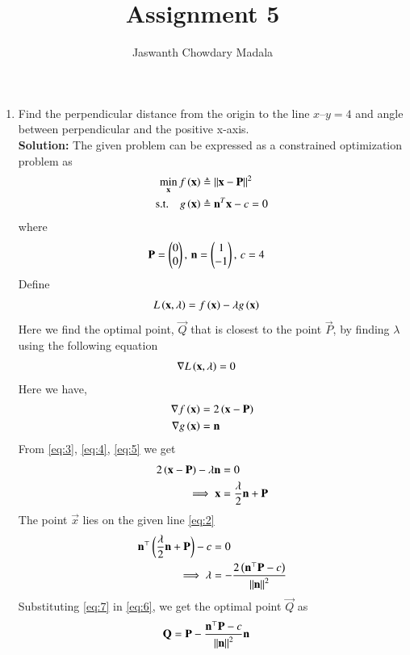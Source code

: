 \documentclass[journal,12pt,twocolumn]{IEEEtran}
\begin{document}
\vspace{3cm}


\title{Assignment 5}
\author{Jaswanth Chowdary Madala}


\maketitle

\newpage


\bigskip

\renewcommand{\thefigure}{\theenumi}
\renewcommand{\thetable}{\theenumi}

\begin{enumerate}
\item Find the perpendicular distance from the origin to the line $x – y = 4$ and angle between perpendicular and the positive x-axis.\\
\textbf{Solution:} The given problem can be expressed as a constrained optimization problem as 
\begin{align}
	\min_{\mathbf{x}}f\left(\mathbf{x}\right) &\triangleq \left\lVert\mathbf{x}-\mathbf{P}\right\rVert^2 \label{eq:1} \\
	\text{s.t.} \quad g\left(\mathbf{x}\right) &\triangleq \mathbf{n}^T\mathbf{x}-c = 0 \label{eq:2}
\end{align}
where
\begin{align}
\mathbf{P} = \begin{pmatrix}0\\0\end{pmatrix}, \, \mathbf{n} = \begin{pmatrix}1\\-1\end{pmatrix}, \, c &= 4 \label{params}
\end{align}
Define
\begin{align}
L\left(\mathbf{x},\lambda\right) &= f\left(\mathbf{x}\right) - \lambda g\left(\mathbf{x}\right)
\end{align}
Here we find the optimal point, $\vec{Q}$ that is closest to the point $\vec{P}$, by finding $\lambda$ using the following equation
\begin{align}
\nabla L\left(\mathbf{x},\lambda\right) &= 0 \label{eq:3}
\end{align}
Here we have, 
\begin{align}
\nabla f\left(\mathbf{x}\right) &= 2\left(\mathbf{x}-\mathbf{P}\right) \label{eq:4}\\
\nabla g\left(\mathbf{x}\right) &= \mathbf{n}\label{eq:5}
\end{align}
From \eqref{eq:3}, \eqref{eq:4}, \eqref{eq:5} we get
\begin{align}
2\left(\mathbf{x}-\mathbf{P}\right) - \lambda\mathbf{n} &= 0\\
\implies \mathbf{x} &= \frac{\lambda}{2}\mathbf{n}+\mathbf{P} \label{eq:6}
\end{align}
The point $\vec{x}$ lies on the given line \eqref{eq:2}  \begin{align}
\mathbf{n}^\top\left(\frac{\lambda}{2}\mathbf{n}+\mathbf{P}\right) - c &= 0 \\
\implies \lambda &= -\frac{2\left(\mathbf{n}^\top\mathbf{P}-c\right)}{\left\lVert\mathbf{n}\right\rVert^2} \label{eq:7}
\end{align}
Substituting \eqref{eq:7} in \eqref{eq:6}, we get the optimal point $\vec{Q}$ as
\begin{align}
\mathbf{Q} &= \mathbf{P} - \frac{\mathbf{n}^\top\mathbf{P}-c}{\left\lVert\mathbf{n}\right\rVert^2}\mathbf{n} \label{eq:8}
\end{align}


\end{enumerate}
\end{document}
